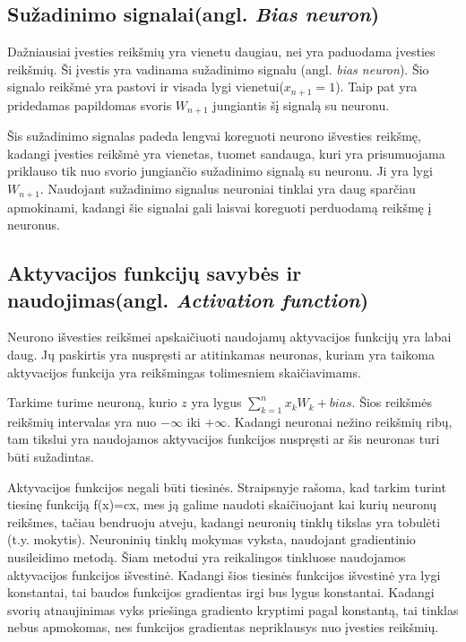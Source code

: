 \subsection{Sužadinimo signalai(angl. \textit{Bias neuron})}
Dažniausiai įvesties reikšmių yra vienetu daugiau, nei yra paduodama įvesties reikšmių. Ši įvestis yra vadinama sužadinimo signalu (angl. \textit{bias neuron}). Šio signalo reikšmė yra pastovi ir visada lygi vienetui($x_{n+1} = 1$). Taip pat yra pridedamas papildomas svoris $W_{n+1}$ jungiantis šį signalą su neuronu.\cite{Ieva2012}

Šis sužadinimo signalas padeda lengvai koreguoti neurono išvesties reikšmę, kadangi įvesties reikšmė yra vienetas, tuomet sandauga, kuri yra prisumuojama priklauso tik nuo svorio jungiančio sužadinimo signalą su neuronu. Ji yra lygi  $W_{n+1}$. Naudojant sužadinimo signalus neuroniai tinklai yra daug sparčiau apmokinami, kadangi šie signalai gali laisvai koreguoti perduodamą reikšmę į neuronus.
  \subsection{Aktyvacijos funkcijų savybės ir naudojimas(angl. \textit{Activation function})}
Neurono išvesties reikšmei apskaičiuoti naudojamų aktyvacijos funkcijų yra labai daug. Jų paskirtis yra nuspręsti ar atitinkamas neuronas, kuriam yra taikoma aktyvacijos funkcija yra reikšmingas tolimesniem skaičiavimams.

Tarkime turime neuroną, kurio $z$ yra lygus $\sum_{k=1}^{n} x_k W_k + bias$. Šios reikšmės reikšmių intervalas yra nuo $-\infty$ iki $+\infty$. Kadangi neuronai nežino reikšmių ribų, tam tikslui yra naudojamos aktyvacijos funkcijos nuspręsti ar šis neuronas turi būti sužadintas.

Aktyvacijos funkcijos negali būti tiesinės. Straipsnyje rašoma, kad tarkim turint tiesinę funkciją f(x)=cx, mes ją galime naudoti skaičiuojant kai kurių neuronų reikšmes, tačiau bendruoju atveju, kadangi neuronių tinklų tikslas yra tobulėti (t.y. mokytis). Neuroninių tinklų mokymas vyksta, naudojant gradientinio nusileidimo metodą. Šiam metodui yra reikalingos tinkluose naudojamos aktyvacijos funkcijos išvestinė. Kadangi šios tiesinės funkcijos išvestinė yra lygi konstantai, tai baudos funkcijos gradientas irgi bus lygus konstantai. Kadangi svorių atnaujinimas vyks priešinga gradiento kryptimi pagal konstantą, tai tinklas nebus apmokomas, nes funkcijos gradientas nepriklausys nuo įvesties reikšmių. \cite{Avinash2017}

